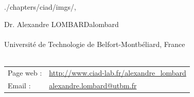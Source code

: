\begin{graphicspathcontext}{{./chapters/ciad/imgs/},\old}
	
	\begin{textpictureframe}{Dr\string. Alexandre LOMBARD}{alombard}
		\vspace{-.25cm}
		 \\
		 \\[.25cm]
		{\scriptsize Universit\'e de Technologie de Belfort-Montb\'eliard, France} \\[.25cm]
		
		 \\[.25cm]
		
		\scriptsize \begin{tabularx}{\linewidth}{@{}lX@{}}
			Page web : & \url{http://www.ciad-lab.fr/alexandre_lombard} \\
			Email : & \href{mailto:alexandre.lombard@utbm.fr}{alexandre.lombard@utbm.fr} \\
		\end{tabularx} \\[.5cm]
		
	\end{textpictureframe}
	
\end{graphicspathcontext}

\endinput
